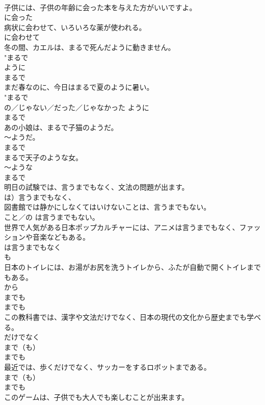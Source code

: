 \documentclass[8pt]{extreport}
\begin{document}
\begin{CJK}{UTF8}{min}
{\\	子供には、子供の年齢に会った本を与えた方がいいですよ。	
\\	に会った 
\\	病状に会わせて、いろいろな薬が使われる。	
\\	に会わせて 
\\	冬の間、カエルは、まるで死んだように動きません。	
\\	"まるで 
\\	ように 
\\	まるで 
\\	まだ春なのに、今日はまるで夏のように暑い。	
\\	"まるで 
\\	{の／じゃない／だった／じゃなかった} ように 
\\	まるで 
\\	あの小娘は、まるで子猫のようだ。	
\\	〜ようだ。 
\\	まるで 
\\	まるで天子のような女。	
\\	〜ような
\\	まるで 
\\	明日の試験では、言うまでもなく、文法の問題が出ます。	
\\	は）言うまでもなく、
\\	図書館では静かにしなくてはいけないことは、言うまでもない。	
\\	{こと／の} は言うまでもない。 
\\	世界で人気がある日本ポップカルチャーには、アニメは言うまでもなく、ファッションや音楽などもある。	
\\	は言うまでもなく 
\\	も 
\\	日本のトイレには、お湯がお尻を洗うトイレから、ふたが自動で開くトイレまでもある。	
\\	から 
\\	までも 
\\	までも 
\\	この教科書では、漢字や文法だけでなく、日本の現代の文化から歴史までも学べる。	
\\	だけでなく 
\\	まで（も） 
\\	までも 
\\	最近では、歩くだけでなく、サッカーをするロボットまである。	
\\	まで（も） 
\\	までも 
\\	このゲームは、子供でも大人でも楽しむことが出来ます。	
}
\end{CJK}
\end{document}
